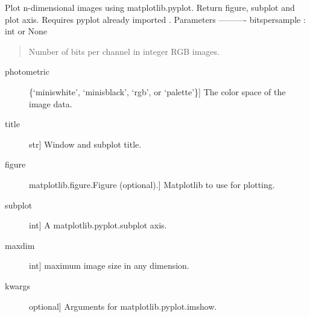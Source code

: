 \documentclass[letterpaper,10pt,english]{sphinxmanual}
\begin{document}
\begin{fulllineitems}
\label{tifffile:tifffile.imshow}
Plot n-dimensional images using matplotlib.pyplot.
Return figure, subplot and plot axis.
Requires pyplot already imported .
Parameters
----------
bitspersample : int or None
\begin{quote}

Number of bits per channel in integer RGB images.
\end{quote}
\begin{description}
\item[{photometric}] \leavevmode{[}\{`miniswhite', `minisblack', `rgb', or `palette'\}{]}
The color space of the image data.

\item[{title}] \leavevmode{[}str{]}
Window and subplot title.

\item[{figure}] \leavevmode{[}matplotlib.figure.Figure (optional).{]}
Matplotlib to use for plotting.

\item[{subplot}] \leavevmode{[}int{]}
A matplotlib.pyplot.subplot axis.

\item[{maxdim}] \leavevmode{[}int{]}
maximum image size in any dimension.

\item[{kwargs}] \leavevmode{[}optional{]}
Arguments for matplotlib.pyplot.imshow.

\end{description}

\end{fulllineitems}

\end{document}
